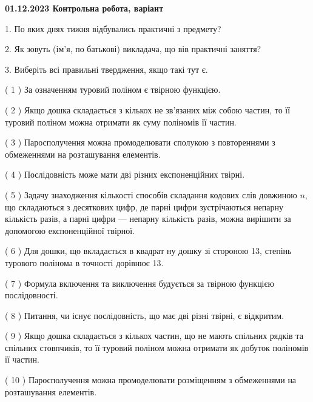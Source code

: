 \documentclass[12pt, ukrainian]{article}
\begin{document}
\vspace{4mm}
\newpage
\begin {large}

\textbf{01.12.2023 Контрольна робота, варіант  }\par


{
1. По яких днях тижня відбувались практичні з предмету?



\vspace{5mm}
2. Як зовуть (ім'я, по батькові) викладача, що вів практичні заняття?



\vspace{5mm}
3. Виберіть всі правильні твердження, якщо такі тут є.\par
\vspace{2mm}
( 1 ) За означенням туровий поліном є твірною функцією.%

( 2 ) Якщо дошка складається з кількох не зв’язаних між собою частин, то її туровий поліном можна отримати як суму поліномів її частин.%

( 3 ) Паросполучення можна промоделювати сполукою з повтореннями з обмеженнями на розташування елементів.%

( 4 ) Послідовність може мати дві різних експоненційних твірні.%

( 5 ) Задачу знаходження кількості способів складання кодових слів довжиною $n$, що складаються з десяткових цифр, де парні цифри зустрічаються непарну кількість разів, а парні цифри — непарну кількість разів, можна вирішити за допомогою експоненційної твірної.%

( 6 ) Для дошки, що вкладається в квадрат ну дошку зі стороною 13, степінь турового полінома в точності дорівнює 13.%

( 7 ) Формула включення та виключення будується за твірною функцією послідовності.%

( 8 ) Питання, чи існує послідовність, що має дві різні твірні, є відкритим.%

( 9 ) Якщо дошка складається з кількох частин, що не мають спільних рядків та спільних стовпчиків, то її туровий поліном можна отримати як добуток поліномів її частин.%

( 10 ) Паросполучення можна промоделювати розміщенням з обмеженнями на розташування елементів.%
}
\end {large}
\end{document}
